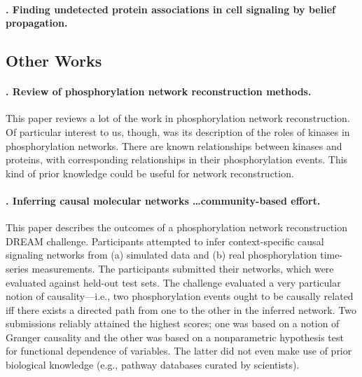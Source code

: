 \documentclass[14pt]{article}
\begin{document}
\paragraph{ \citet{2011-bailly-bechet-belief}. Finding undetected protein associations in cell signaling by belief propagation.}




\subsection{Other Works}

\paragraph{ \citet{2018-invergo-review}. Review of phosphorylation network reconstruction methods. }
This paper reviews a lot of the work in phosphorylation network reconstruction.
Of particular interest to us, though, was its description of the roles of kinases in phosphorylation networks. 
There are known relationships between kinases and proteins, with corresponding relationships in their phosphorylation events.
This kind of prior knowledge could be useful for network reconstruction.

\paragraph{ \citet{2016-hill-community}. Inferring causal molecular networks \ldots community-based effort.}
This paper describes the outcomes of a phosphorylation network reconstruction DREAM challenge.
Participants attempted to infer context-specific causal signaling networks from (a) simulated data and (b) real phosphorylation time-series measurements.
The participants submitted their networks, which were evaluated against held-out test sets.
The challenge evaluated a very particular notion of causality---i.e., two phosphorylation events ought to be causally related iff there exists a directed path from one to the other in the inferred network.
Two submissions reliably attained the highest scores; one was based on a notion of Granger causality and the other was based on a nonparametric hypothesis test for functional dependence of variables.
The latter did not even make use of prior biological knowledge (e.g., pathway databases curated by scientists).
\end{document}
